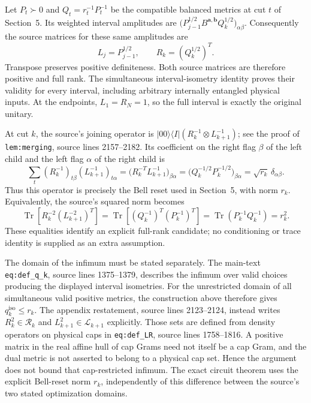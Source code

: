 \documentclass[11pt]{article}
\begin{document}
Let $P_t\succ0$ and $Q_t=r_t^{-1}P_t^{-1}$ be the compatible balanced
metrics at cut $t$ of Section~5. Its weighted interval amplitudes are
$\bigl(P_{j-1}^{1/2}B^{\mathbf a,\mathbf b}Q_k^{1/2}\bigr)_{\alpha\beta}$.
Consequently the source matrices for these same amplitudes are
\[
 L_j=P_{j-1}^{1/2},\qquad R_k=(Q_k^{1/2})^T.
\]
Transpose preserves positive definiteness. Both source matrices are
therefore positive and full rank. The simultaneous interval-isometry
identity proves their validity for every interval, including arbitrary
internally entangled physical inputs. At the endpoints,
$L_1=R_N=1$, so the full interval is exactly the original unitary.

At cut $k$, the source's joining operator is
$|00\rangle\langle I|(R_k^{-1}\otimes L_{k+1}^{-1})$; see the proof of
\nolinkurl{lem:merging}, source lines 2157--2182. Its coefficient
on the right flag $\beta$ of the left child and the left flag $\alpha$
of the right child is
\[
 \sum_t(R_k^{-1})_{t\beta}(L_{k+1}^{-1})_{t\alpha}
 =\bigl(R_k^{-T}L_{k+1}^{-1}\bigr)_{\beta\alpha}
 =\bigl(Q_k^{-1/2}P_k^{-1/2}\bigr)_{\beta\alpha}
 =\sqrt{r_k}\,\delta_{\alpha\beta}.
\]
Thus this operator is precisely the Bell reset used in Section~5,
with norm $r_k$. Equivalently, the source's squared norm becomes
\[
 \operatorname{Tr}\!\left[R_k^{-2}(L_{k+1}^{-2})^T\right]
 =\operatorname{Tr}\!\left[(Q_k^{-1})^T(P_k^{-1})^T\right]
 =\operatorname{Tr}(P_k^{-1}Q_k^{-1})=r_k^2.
\]
These equalities identify an explicit full-rank candidate; no
conditioning or trace identity is supplied as an extra assumption.

The domain of the infimum must be stated separately. The main-text
\nolinkurl{eq:def_q_k}, source lines 1375--1379, describes the
infimum over valid choices producing the displayed interval isometries.
For the unrestricted domain of all simultaneous valid positive metrics,
the construction above therefore gives $q_k^{\mathrm{iso}}\leq r_k$.
The appendix restatement, source lines 2123--2124, instead writes
$R_k^2\in\mathcal R_k$ and $L_{k+1}^2\in\mathcal L_{k+1}$ explicitly.
Those sets are defined from density operators on physical caps in
\nolinkurl{eq:def_LR}, source lines 1758--1816.
A positive matrix in the real affine hull of cap Grams need not itself
be a cap Gram, and the dual metric is not asserted to belong to a
physical cap set. Hence the argument does not bound that
cap-restricted infimum. The exact circuit theorem uses the explicit
Bell-reset norm $r_k$, independently of this difference between the
source's two stated optimization domains.
\end{document}
